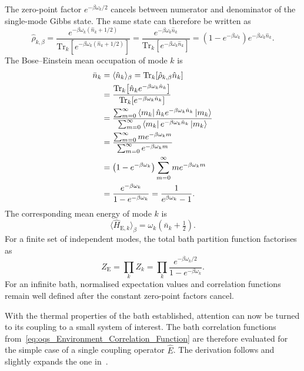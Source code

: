 The zero-point factor \(e^{-\beta\omega_k/2}\) cancels between numerator and denominator of the single-mode Gibbs state. The same state can therefore be written as
\begin{equation*}
	\hat{\rho}_{k,\beta}
	=
	\frac{e^{-\beta \omega_k(\hat{n}_k+1/2)}}{\mathrm{Tr}_k\!\left[e^{-\beta \omega_k(\hat{n}_k+1/2)}\right]}
	=
	\frac{e^{-\beta \omega_k\hat{n}_k}}{\mathrm{Tr}_k\!\left[e^{-\beta \omega_k\hat{n}_k}\right]}
	=
	\left(1-e^{-\beta\omega_k}\right)
	e^{-\beta\omega_k \hat{n}_k}.
\end{equation*}
The Bose--Einstein mean occupation of mode \(k\) is
\begin{align}
	\bar{n}_k
	&=
	\langle \hat{n}_k \rangle_\beta
	=
	\mathrm{Tr}_k\!\left[\hat{\rho}_{k,\beta}\hat{n}_k\right] \notag\\
	&=
	\frac{\mathrm{Tr}_k\!\left[\hat{n}_k e^{-\beta\omega_k\hat{n}_k}\right]}
	{\mathrm{Tr}_k\!\left[e^{-\beta\omega_k\hat{n}_k}\right]} \notag\\
	&=
	\frac{
	\sum_{m=0}^{\infty}
	\bra{m_k}\hat{n}_k e^{-\beta\omega_k\hat{n}_k}\ket{m_k}
	}{
	\sum_{m=0}^{\infty}
	\bra{m_k}e^{-\beta\omega_k\hat{n}_k}\ket{m_k}
	} \notag\\
	&=
	\frac{\sum_{m=0}^{\infty} m e^{-\beta\omega_k m}}
	{\sum_{m=0}^{\infty} e^{-\beta\omega_k m}} \notag\\
	&=
	\left(1-e^{-\beta\omega_k}\right)
	\sum_{m=0}^{\infty} m e^{-\beta\omega_k m} \notag\\
	&=
	\frac{e^{-\beta\omega_k}}{1-e^{-\beta\omega_k}}
	=
	\frac{1}{e^{\beta\omega_k}-1}.
	\label{eq:oqs_ho_expectation_number_operator}
\end{align}
The corresponding mean energy of mode \(k\) is
\begin{equation*}
	\langle \hat{H}_{\mathrm{E},k} \rangle_\beta
	=
	\omega_k\left(\bar{n}_k+\tfrac{1}{2}\right).
\end{equation*}
For a finite set of independent modes, the total bath partition function factorises as
\begin{equation*}
	Z_{\mathrm{E}}
	=
	\prod_k Z_k
	=
	\prod_k
	\frac{e^{-\beta\omega_k/2}}{1-e^{-\beta\omega_k}}.
\end{equation*}
For an infinite bath, normalised expectation values and correlation functions remain well defined after the constant zero-point factors cancel.

With the thermal properties of the bath established, attention can now be turned to its coupling to a small system of interest. The bath correlation functions from~\autoref{eq:oqs_Environment_Correlation_Function} are therefore evaluated for the simple case of a single coupling operator \(\hat{E}\). The derivation follows and slightly expands the one in~\cite{thingna2013steadystatetransportproperties}.



